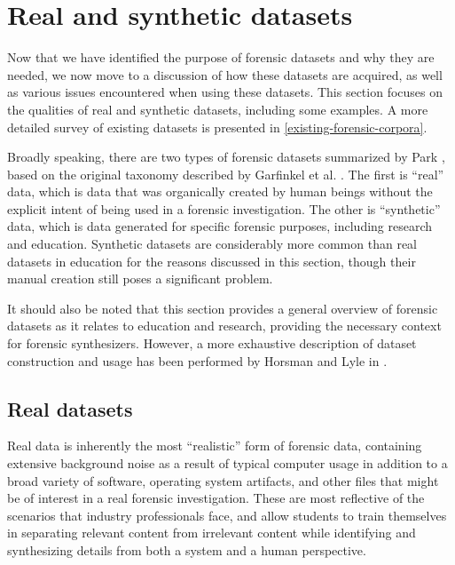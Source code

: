 \documentclass[letterpaper,12pt]{report}
\begin{document}
\section{Real and synthetic
datasets}\label{real-and-synthetic-datasets}

Now that we have identified the purpose of forensic datasets and why
they are needed, we now move to a discussion of how these datasets are
acquired, as well as various issues encountered when using these
datasets. This section focuses on the qualities of real and synthetic
datasets, including some examples. A more detailed survey of existing
datasets is presented in \autoref{existing-forensic-corpora}.

Broadly speaking, there are two types of forensic datasets summarized by
Park \cite{parkTREDEVMPOPCultivating2018}, based on the original
taxonomy described by Garfinkel et al.
\cite{garfinkelBringingScienceDigital2009}. The first is ``real''
data, which is data that was organically created by human beings without
the explicit intent of being used in a forensic investigation. The other
is ``synthetic'' data, which is data generated for specific forensic
purposes, including research and education. Synthetic datasets are
considerably more common than real datasets in education for the reasons
discussed in this section, though their manual creation still poses a
significant problem.

It should also be noted that this section provides a general overview of
forensic datasets as it relates to education and research, providing the
necessary context for forensic synthesizers. However, a more exhaustive
description of dataset construction and usage has been performed by
Horsman and Lyle in \cite{horsmanDatasetConstructionChallenges2021}.

\subsection{Real datasets}\label{real-datasets}

Real data is inherently the most ``realistic'' form of forensic data,
containing extensive background noise as a result of typical computer
usage in addition to a broad variety of software, operating system
artifacts, and other files that might be of interest in a real forensic
investigation. These are most reflective of the scenarios that industry
professionals face, and allow students to train themselves in separating
relevant content from irrelevant content while identifying and
synthesizing details from both a system and a human perspective.
\end{document}
